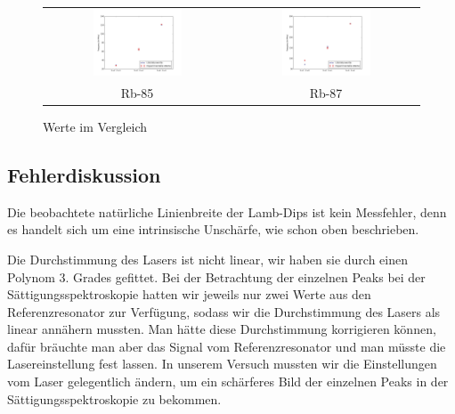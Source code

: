 \documentclass[a4paper,parskip]{scrartcl}
\begin{document}
\begin{figure}[h]
\centering
\begin{tabular}{cc}
    \includegraphics[width = 0.5\textwidth]{daten_Rb-85.png}  &  \includegraphics[width = 0.5\textwidth]{daten_Rb-87.png}  \\
    {\footnotesize Rb-85} & {\footnotesize Rb-87}  \\
\end{tabular}
\caption{Werte im Vergleich}
\label{fig:Abbildung2}
\end{figure}

\subsection{Fehlerdiskussion}

Die beobachtete natürliche Linienbreite der Lamb-Dips ist kein Messfehler, denn es handelt sich um eine intrinsische Unschärfe, wie schon oben beschrieben.

Die Durchstimmung des Lasers ist nicht linear, wir haben sie durch einen Polynom 3. Grades gefittet. Bei der Betrachtung der einzelnen Peaks bei der Sättigungsspektroskopie hatten wir jeweils nur zwei Werte aus den Referenzresonator zur Verfügung, sodass wir die Durchstimmung des Lasers als linear annähern mussten. Man hätte diese Durchstimmung korrigieren können, dafür bräuchte man aber das Signal vom Referenzresonator und man müsste die Lasereinstellung fest lassen. In unserem Versuch mussten wir die Einstellungen vom Laser gelegentlich ändern, um ein schärferes Bild der einzelnen Peaks in der Sättigungsspektroskopie zu bekommen.
\end{document}
